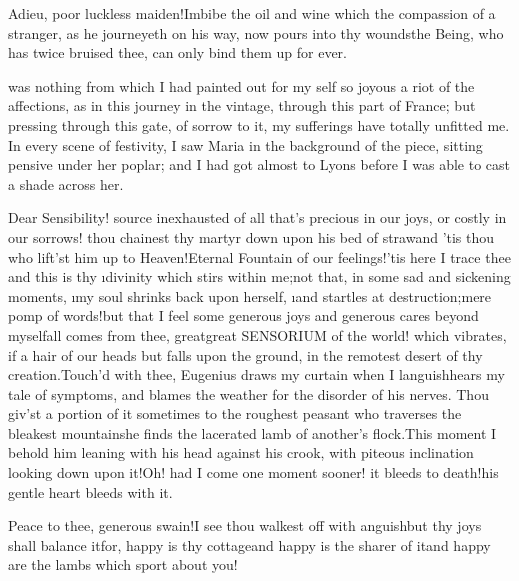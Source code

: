 \documentclass[twoside]{article}
\begin{document}
Adieu, poor luckless maiden!\tskk Imbibe
the oil and wine which the compassion of a
stranger, as he journeyeth on his way, now
pours into thy wounds\tskk the Being, who
has twice bruised thee, can only bind them
up for ever.





\vskip 6pt


 was nothing from which I
had painted out for my self so joyous a
riot of the affections, as in this journey
in the vintage, through this part of
France; but pressing through this gate, of
sorrow to it, my sufferings have totally
unfitted me.  In every scene of festivity,
I saw Maria in the background of the
piece, sitting pensive under her poplar;
and I had got almost to Lyons before I was
able to cast a shade across her.

\tskk Dear Sensibility! source inexhausted
of all that’s precious in our joys, or
costly in our sorrows! thou chainest thy
martyr down upon his bed of straw\tskk and
’tis thou who lift’st him up to
Heaven!\tskk Eternal Fountain of our
feelings!\tskk ’tis here I trace thee\tskk
and this is thy \lqq \i{divinity which stirs
within me};\rqq \tskk not that, in some sad
and sickening moments, \lqq \i{my soul shrinks
back upon herself}, \i{and startles at
destruction};\rqq \tskk mere pomp of
words!\tskk but that I feel some generous
joys and generous cares beyond
myself\tskk all comes from thee,
great\tskk great SENSORIUM of the world!
which vibrates, if a hair of our heads but
falls upon the ground, in the remotest
desert of thy creation.\tskk Touch’d with
thee, Eugenius draws my curtain when I
languish\tskk hears my tale of symptoms,
and blames the weather for the disorder of
his nerves.  Thou giv’st a portion of it
sometimes to the roughest peasant who
traverses the bleakest mountains\tskk he
finds the lacerated lamb of another’s
flock.\tskk This moment I behold him
leaning with his head against his crook,
with piteous inclination looking down upon
it!\tskk Oh! had I come one moment sooner!
it bleeds to death!\tskk his gentle heart
bleeds with it.\tskk 

Peace to thee, generous swain!\tskk I see
thou walkest off with anguish\tskk but
thy joys shall balance it\tskk for, happy
is thy cottage\tskk and happy is the
sharer of it\tskk and happy are the lambs
which sport about you!




\end{document}
